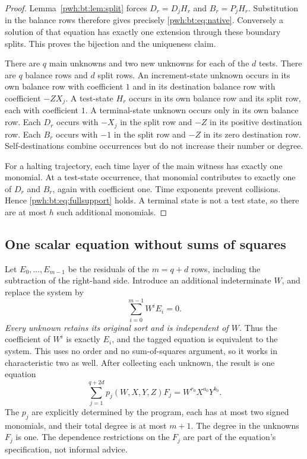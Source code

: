 \documentclass[11pt,letterpaper]{article}
\numberwithin{equation}{section}
\theoremstyle{definition}
\begin{document}
\begin{proof}
Lemma~\ref{pwh:bt:lem:split} forces $D_r=D_jH_r$ and $B_r=P_jH_r$.
Substitution in the balance rows therefore gives precisely
\eqref{pwh:bt:eq:native}. Conversely a solution of that equation has exactly
one extension through these boundary splits. This proves the bijection
and the uniqueness claim.

There are $q$ main unknowns and two new unknowns for each of the $d$
tests. There are $q$ balance rows and $d$ split rows. An increment-state
unknown occurs in its own balance row with coefficient $1$ and in its
destination balance row with coefficient $-ZX_j$. A test-state $H_r$
occurs in its own balance row and its split row, each with coefficient
$1$. A terminal-state unknown occurs only in its own balance row.
Each $D_r$ occurs with $-X_j$ in the split row and $-Z$ in its positive
destination row. Each $B_r$ occurs with $-1$ in the split row and $-Z$
in its zero destination row. Self-destinations combine occurrences but
do not increase their number or degree.

For a halting trajectory, each time layer of the main witness has
exactly one monomial. At a test-state occurrence, that monomial
contributes to exactly one of $D_r$ and $B_r$, again with coefficient
one. Time exponents prevent collisions. Hence \eqref{pwh:bt:eq:fullsupport}
holds. A terminal state is not a test state, so there are at most $h$
such additional monomials.
\end{proof}

\subsection{One scalar equation without sums of squares}
Let $E_0,\ldots,E_{m-1}$ be the residuals of the $m=q+d$ rows, including
the subtraction of the right-hand side. Introduce an additional
indeterminate $W$, and replace the system by
\begin{equation}\label{pwh:bt:eq:tag}
 \sum_{i=0}^{m-1}W^iE_i=0.
\end{equation}
\emph{Every unknown retains its original sort and is independent of
$W$.} Thus the coefficient of $W^i$ is exactly $E_i$, and the tagged
equation is equivalent to the system. This uses no order and no
sum-of-squares argument, so it works in characteristic two as well.
After collecting each unknown, the result is one equation
\begin{equation}\label{pwh:bt:eq:scalar}
 \sum_{j=1}^{q+2d}p_j(W,X,Y,Z)F_j
   =W^{r_0}X^{a_0}Y^{b_0}.
\end{equation}
The $p_j$ are explicitly determined by the program, each has at most two
signed monomials, and their total degree is at most $m+1$. The degree in
the unknowns $F_j$ is one. The dependence restrictions on the $F_j$ are
part of the equation's specification, not informal advice.
\end{document}
